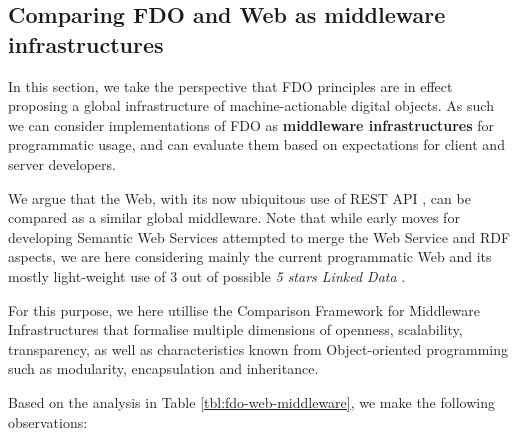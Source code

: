 \documentclass[fleqn,10pt,NOlineno]{wlpeerjlua}
\begin{document}


\subsection*{Comparing FDO and Web as middleware infrastructures}\label{sec:middleware}

In this section, we take the perspective that FDO principles are in effect proposing a global infrastructure of machine-actionable digital objects. As such we can consider implementations of FDO as \textbf{middleware infrastructures} for programmatic usage, and can evaluate them based on expectations for client and server developers.

We argue that the Web, with its now ubiquitous use of REST API \autocite{fieldingArchitecturalStylesDesign2000a}, can be compared as a similar global middleware. Note that while early moves for developing Semantic Web Services \autocite{fenselSemanticWebServices2011} attempted to merge the Web Service and RDF aspects, we are here considering mainly the current programmatic Web and its mostly light-weight use of 3 out of possible \emph{5 stars Linked Data} \autocite{OpenData}.

For this purpose, we here utillise the Comparison Framework for Middleware Infrastructures \autocite{zarrasComparisonFrameworkMiddleware2004a} that formalise multiple dimensions of openness, scalability, transparency, as well as characteristics known from Object-oriented programming such as modularity, encapsulation and inheritance.

Based on the analysis in Table \vref{tbl:fdo-web-middleware}, we make the following observations:
\end{document}
